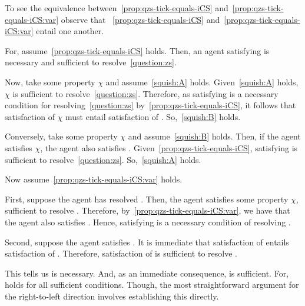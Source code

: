 \begin{note}
  To see the equivalence between~\autoref{prop:qzs-tick-equals-iCS} and~\autoref{prop:qzs-tick-equals-iCS:var} observe that ~\autoref{prop:qzs-tick-equals-iCS} and~\autoref{prop:qzs-tick-equals-iCS:var} entail one another.

  For, assume~\autoref{prop:qzs-tick-equals-iCS} holds.
  Then, an agent satisfying \iCS{} is necessary and sufficient to resolve~\autoref{question:zs}.

  Now, take some property \(\chi\) and assume~\ref{squish:A} holds.
  Given~\ref{squish:A} holds, \(\chi\) is sufficient to resolve~\autoref{question:zs}.
  Therefore, as satisfying \iCS{} is a necessary condition for resolving~\autoref{question:zs} by~\autoref{prop:qzs-tick-equals-iCS}, it follows that satisfaction of \(\chi\) must entail satisfaction of \iCS{}.
  So,~\ref{squish:B} holds.

  Conversely, take some property \(\chi\) and assume~\ref{squish:B} holds.
  Then, if the agent satisfies \(\chi\), the agent also satisfies \iCS{}.
  Given~\autoref{prop:qzs-tick-equals-iCS}, satisfying \iCS{} is sufficient to resolve~\autoref{question:zs}.
  So,~\ref{squish:A} holds.

  Now assume~\autoref{prop:qzs-tick-equals-iCS:var} holds.

  First, suppose the agent has resolved \qzs{}.
  Then, the agent satisfies some property \(\chi\), sufficient to resolve \qzs{}.
  Therefore, by~\autoref{prop:qzs-tick-equals-iCS:var}, we have that the agent also satisfies \iCS{}.
  Hence, satisfying \iCS{} is a necessary condition of resolving \qzs{}.

  Second, suppose the agent satisfies \iCS{}.
  It is immediate that satisfaction of \iCS{} entails satisfaction of \iCS{}.
  Therefore, satisfaction of \iCS{} is sufficient to resolve \qzs{}.

  This tells us \iCS{} is necessary.
  And, as an immediate consequence, \iCS{} is sufficient.
  For, holds for all sufficient conditions.
  Though, the most straightforward argument for the right-to-left direction involves establishing this directly.
\end{note}


